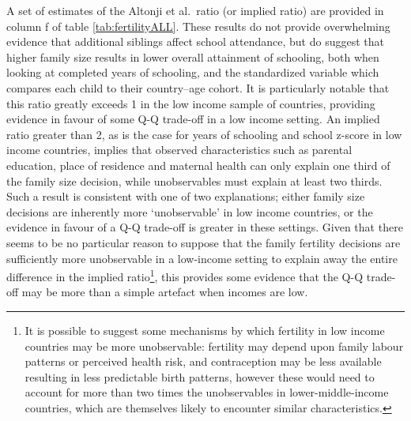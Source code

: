 \documentclass{article}[11pt,subeqn]
\begin{document}
\begin{spacing}{1.5}
A set of estimates of the Altonji et al.\ ratio (or implied ratio) are provided in column f of table \ref{tab:fertilityALL}.  These results do not provide overwhelming evidence
that additional siblings affect school attendance, but do suggest that higher family size results in lower overall attainment of schooling, both when looking at completed years of schooling, and the standardized variable which compares each child to their country--age cohort.  It is particularly notable that this ratio greatly exceeds 1 in the low income sample of
countries, providing evidence in favour of some Q-Q trade-off in a low income setting.  An implied ratio greater than 2, as is the case for years of schooling and school z-score in low income countries, implies that observed characteristics such as parental education, place of residence and maternal health can only explain one third of the family size decision, while unobservables must explain at least two thirds.  Such a result is consistent with one of two explanations; either family size decisions are inherently more `unobservable' in low income countries, or the evidence in favour of a Q-Q trade-off is greater in these settings.  Given that there seems to be no particular reason to suppose that the family fertility decisions are sufficiently more unobservable in a low-income setting to explain away the entire difference in the implied ratio\footnote{It is possible to suggest some mechanisms by which fertility in low income countries may be more unobservable: fertility may depend upon family labour patterns or perceived health risk, and contraception may be less available resulting in less predictable birth patterns, however these would need to account for more than two times the unobservables in lower-middle-income countries, which are themselves likely to encounter similar characteristics.}, this provides some evidence that the Q-Q trade-off may be more than a simple artefact when incomes are low. 



\end{spacing}
\end{document}
